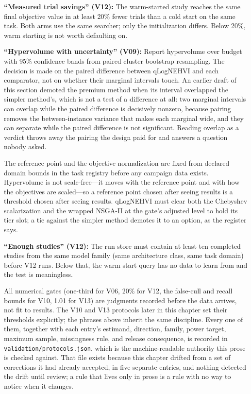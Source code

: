 \textbf{``Measured trial savings'' (V12):} The warm-started study
reaches the same final objective value in at least 20\% fewer trials
than a cold start on the same task. Both arms use the same searcher;
only the initialization differs. Below 20\%, warm starting is not
worth defaulting on.

\textbf{``Hypervolume with uncertainty'' (V09):} Report hypervolume
over budget with 95\% confidence bands from paired cluster bootstrap
resampling. The decision is made on the paired difference between
qLogNEHVI and each comparator, not on whether their marginal intervals
touch. An earlier draft of this section demoted the premium method when
its interval overlapped the simpler method's, which is not a test of a
difference at all: two marginal intervals can overlap while the paired
difference is decisively nonzero, because pairing removes the
between-instance variance that makes each marginal wide, and they can
separate while the paired difference is not significant. Reading overlap
as a verdict throws away the pairing the design paid for and answers a
question nobody asked.

The reference point and the objective normalization are fixed from
declared domain bounds in the task registry before any campaign data
exists. Hypervolume is not scale-free—it moves with the reference point
and with how the objectives are scaled—so a reference point chosen after
seeing results is a threshold chosen after seeing results. qLogNEHVI
must clear both the Chebyshev scalarization and the wrapped NSGA-II at
the gate's adjusted level to hold its tier slot; a tie against the
simpler method demotes it to an option, as the register says.

\textbf{``Enough studies'' (V12):} The run store must contain at
least ten completed studies from the same model family (same
architecture class, same task domain) before V12 runs. Below that,
the warm-start query has no data to learn from and the test is
meaningless.

All numerical gates (one-third for V06, 20\% for V12, the false-cull
and recall bounds for V10, 1.01 for V13) are judgments recorded before
the data arrives, not fit to results. The V10 and V13 protocols later in
this chapter set their thresholds explicitly; the phrases above inherit
the same discipline. Every one of them, together with each entry's
estimand, direction, family, power target, maximum sample, missingness
rule, and release consequence, is recorded in
\texttt{validation/protocols.json}, which is the machine-readable
authority this prose is checked against. That file exists because this
chapter drifted from a set of corrections it had already accepted, in
five separate entries, and nothing detected the drift until review; a
rule that lives only in prose is a rule with no way to notice when it
changes.


